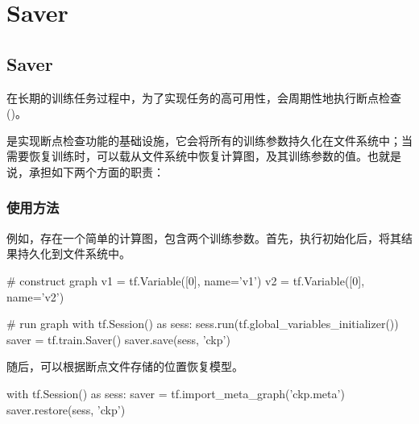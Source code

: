 \begin{savequote}[45mm]
\end{savequote}

\chapter{Saver} 
\label{ch:saver}

\section{Saver}

\begin{content}

在长期的训练任务过程中，为了实现任务的高可用性，\tf{}会周期性地执行断点检查()。

是实现断点检查功能的基础设施，它会将所有的训练参数持久化在文件系统中；当需要恢复训练时，可以载从文件系统中恢复计算图，及其训练参数的值。也就是说，承担如下两个方面的职责：

\begin{enum}
\end{enum}

\subsection{使用方法}

例如，存在一个简单的计算图，包含两个训练参数。首先，执行初始化后，将其结果持久化到文件系统中。

\begin{leftbar}
\begin{python}
# construct graph
v1 = tf.Variable([0], name='v1')
v2 = tf.Variable([0], name='v2')

# run graph
with tf.Session() as sess:
  sess.run(tf.global_variables_initializer())
  saver = tf.train.Saver()
  saver.save(sess, 'ckp')
\end{python}
\end{leftbar}

随后，可以根据断点文件存储的位置恢复模型。

\begin{leftbar}
\begin{python}
with tf.Session() as sess:
  saver = tf.import_meta_graph('ckp.meta')
  saver.restore(sess, 'ckp')
\end{python}
\end{leftbar}


\end{content}
